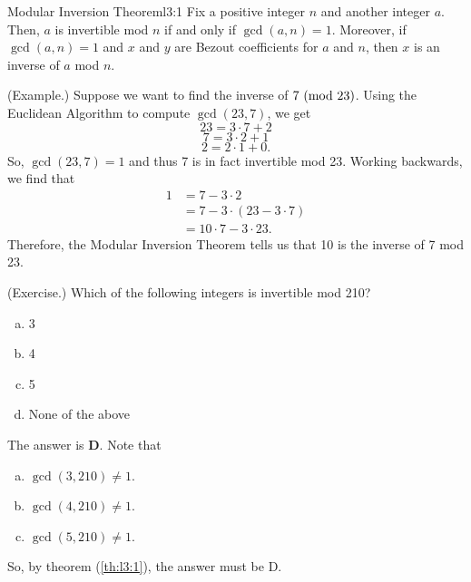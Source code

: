 \documentclass[letterpaper]{article}
\begin{document}
\begin{theorem}{Modular Inversion Theorem}{l3:1}
    Fix a positive integer $n$ and another integer $a$. Then, $a$ is invertible mod $n$ if and only if $\gcd(a, n) = 1$. Moreover, if $\gcd(a, n) = 1$ and $x$ and $y$ are Bezout coefficients for $a$ and $n$, then $x$ is an inverse of $a$ mod $n$. 
\end{theorem}

\begin{mdframed}
    (Example.) Suppose we want to find the inverse of $7 \ (\mathrm{mod}\ 23)$. Using the Euclidean Algorithm to compute $\gcd(23, 7)$, we get 
    \[23 = 3 \cdot 7 + 2\]
    \[7 = 3 \cdot 2 + 1\]
    \[2 = 2 \cdot 1 + 0.\]
    So, $\gcd(23, 7) = 1$ and thus 7 is in fact invertible mod 23. Working backwards, we find that 
    \begin{equation*}
        \begin{aligned}
            1 &= 7 - 3 \cdot 2 \\ 
                &= 7 - 3 \cdot (23 - 3 \cdot 7) \\ 
                &= 10 \cdot 7 - 3 \cdot 23.
        \end{aligned}
    \end{equation*}
    Therefore, the Modular Inversion Theorem tells us that 10 is the inverse of 7 mod 23. 
\end{mdframed}

\begin{mdframed}
    (Exercise.) Which of the following integers is invertible mod 210? 
    \begin{enumerate}[(a)]
        \item 3 
        \item 4
        \item 5
        \item None of the above 
    \end{enumerate}

    \begin{mdframed}
        The answer is \textbf{D}. Note that 
        \begin{enumerate}[(a)]
            \item $\gcd(3, 210) \neq 1$.
            \item $\gcd(4, 210) \neq 1$.
            \item $\gcd(5, 210) \neq 1$. 
        \end{enumerate} 
        So, by theorem (\ref{th:l3:1}), the answer must be D. 
    \end{mdframed}
\end{mdframed}
\end{document}
